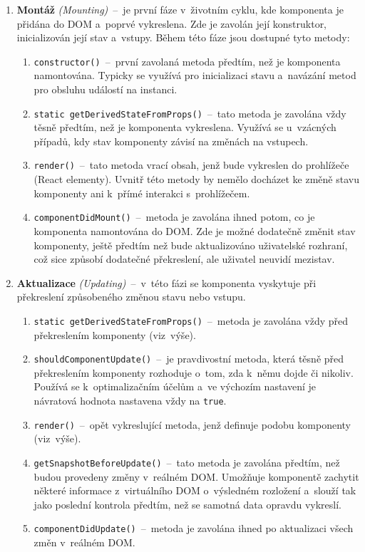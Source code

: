 \begin{enumerate}
    \item \textbf{Montáž} \emph{(Mounting)}~--~je první fáze v~životním cyklu, kde komponenta je přidána do DOM a~poprvé vykreslena. Zde je zavolán její konstruktor, inicializován její stav a~vstupy. Během této fáze jsou dostupné tyto metody:
    \begin{enumerate}
        \item \texttt{constructor()}~--~první zavolaná metoda předtím, než je komponenta namontována. Typicky se využívá pro inicializaci stavu a~navázání metod pro obsluhu událostí na instanci.
        \item \texttt{static getDerivedStateFromProps()}~--~tato metoda je zavolána vždy těsně předtím, než je komponenta vykreslena. Využívá se u~vzácných případů, kdy stav komponenty závisí na změnách na vstupech.
        \item \texttt{render()}~--~tato metoda vrací obsah, jenž bude vykreslen do prohlížeče (React elementy). Uvnitř této metody by nemělo docházet ke změně stavu komponenty ani k~přímé interakci s~prohlížečem.
        \item \texttt{componentDidMount()}~--~metoda je zavolána ihned potom, co je komponenta namontována do DOM. Zde je možné dodatečně změnit stav komponenty, ještě předtím než bude aktualizováno uživatelské rozhraní, což sice způsobí dodatečné překreslení, ale uživatel neuvidí mezistav.
    \end{enumerate}
    
    \item \textbf{Aktualizace} \emph{(Updating)}~--~v~této fázi se komponenta vyskytuje při překreslení způsobeného změnou stavu nebo vstupu.
    \begin{enumerate}
        \item \texttt{static getDerivedStateFromProps()}~--~metoda je zavolána vždy před překreslením komponenty (viz~výše). 
        \item \texttt{shouldComponentUpdate()}~--~je pravdivostní metoda, která těsně před překreslením komponenty rozhoduje o~tom, zda k~němu dojde či nikoliv. Používá se k~optimalizačním účelům a~ve výchozím nastavení je návratová hodnota nastavena vždy na \texttt{true}.
        \item \texttt{render()}~--~opět vykreslující metoda, jenž definuje podobu komponenty (viz~výše).
        \item \texttt{getSnapshotBeforeUpdate()}~--~tato metoda je zavolána předtím, než budou provedeny změny v~reálném DOM. Umožňuje komponentě zachytit některé informace z~virtuálního DOM o~výsledném rozložení a~slouží tak jako poslední kontrola předtím, než se samotná data opravdu vykreslí.
        \item \texttt{componentDidUpdate()}~--~metoda je zavolána ihned po aktualizaci všech změn v~reálném DOM.
    \end{enumerate}
    

\end{enumerate}
